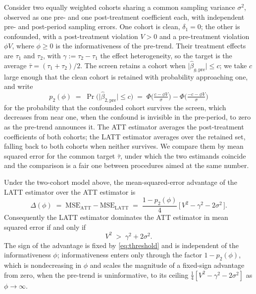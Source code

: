 Consider two equally weighted cohorts sharing a common sampling variance $\sigma^2$,
observed as one pre- and one post-treatment coefficient each, with independent pre-
and post-period sampling errors. One cohort is clean, $\delta_1=0$; the other is
confounded, with a post-treatment violation $V>0$ and a pre-treatment violation
$\phi V$, where $\phi\ge 0$ is the informativeness of the pre-trend. Their treatment
effects are $\tau_1$ and $\tau_2$, with $\gamma:=\tau_2-\tau_1$ the effect
heterogeneity, so the target is the average $\bar\tau=(\tau_1+\tau_2)/2$. The screen
retains a cohort when $\lvert\hat\beta_{g,\mathrm{pre}}\rvert\le c$; we take $c$ large
enough that the clean cohort is retained with probability approaching one, and write
\begin{equation}\label{eq:p2}
p_2(\phi)\;=\;\Pr\!\big(\lvert\hat\beta_{2,\mathrm{pre}}\rvert\le c\big)
\;=\;\Phi\!\Big(\tfrac{c-\phi V}{\sigma}\Big)-\Phi\!\Big(\tfrac{-c-\phi V}{\sigma}\Big)
\end{equation}
for the probability that the confounded cohort survives the screen, which decreases
from near one, when the confound is invisible in the pre-period, to zero as the
pre-trend announces it. The ATT estimator averages the post-treatment coefficients of
both cohorts; the LATT estimator averages over the retained set, falling back to both
cohorts when neither survives. We compare them by mean squared error for the common
target $\bar\tau$, under which the two estimands coincide and the comparison is a fair
one between procedures aimed at the same number.

\begin{proposition}\label{prop:dominance}
Under the two-cohort model above, the mean-squared-error advantage of the LATT
estimator over the ATT estimator is
\begin{equation}\label{eq:delta}
\Delta(\phi)\;=\;\mathrm{MSE}_{\mathrm{ATT}}-\mathrm{MSE}_{\mathrm{LATT}}
\;=\;\frac{1-p_2(\phi)}{4}\,\big[\,V^2-\gamma^2-2\sigma^2\,\big].
\end{equation}
Consequently the LATT estimator dominates the ATT estimator in mean squared error if
and only if
\begin{equation}\label{eq:threshold}
V^2\;>\;\gamma^2+2\sigma^2 .
\end{equation}
The sign of the advantage is fixed by \eqref{eq:threshold} and is independent of the
informativeness $\phi$; informativeness enters only through the factor $1-p_2(\phi)$,
which is nondecreasing in $\phi$ and scales the magnitude of a fixed-sign advantage
from zero, when the pre-trend is uninformative, to its ceiling $\tfrac14[V^2-\gamma^2-2\sigma^2]$
as $\phi\to\infty$.
\end{proposition}

